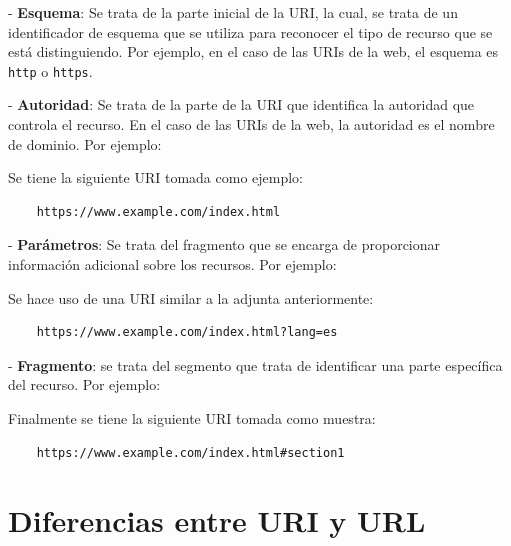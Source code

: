 \documentclass[11pt]{report}
\begin{document}
- \textbf{Esquema}: Se trata de la parte inicial de la URI, la cual, se trata de un identificador de esquema que se utiliza para reconocer el tipo de recurso que se está distinguiendo. Por ejemplo, en el caso de las URIs de la web, el esquema es \texttt{http} o \texttt{https}.

- \textbf{Autoridad}: Se trata de la parte de la URI que identifica la autoridad que controla el recurso. En el caso de las URIs de la web, la autoridad es el nombre de dominio. Por ejemplo:

Se tiene la siguiente URI tomada como ejemplo:

\begin{verbatim}
	https://www.example.com/index.html
\end{verbatim}


- \textbf{Parámetros}: Se trata del fragmento que se encarga de proporcionar información adicional sobre los recursos. Por ejemplo:

Se hace uso de una URI similar a la adjunta anteriormente:

\begin{verbatim}
	https://www.example.com/index.html?lang=es
\end{verbatim}


- \textbf{Fragmento}: se trata del segmento que trata de identificar una parte específica del recurso. Por ejemplo:

Finalmente se tiene la siguiente URI tomada como muestra:

\begin{verbatim}
	https://www.example.com/index.html#section1
\end{verbatim}


\section{Diferencias entre URI y URL}
\end{document}
